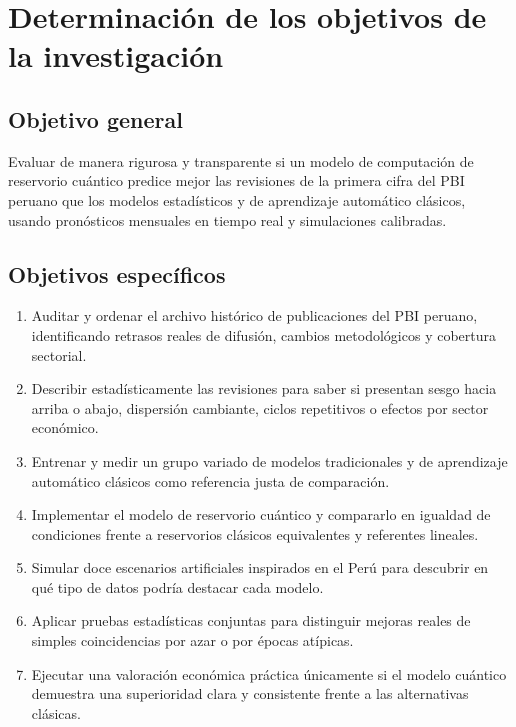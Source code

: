 \section{Determinación de los objetivos de la investigación}

\subsection{Objetivo general}

Evaluar de manera rigurosa y transparente si un modelo de computación de reservorio cuántico predice mejor las revisiones de la primera cifra del PBI peruano que los modelos estadísticos y de aprendizaje automático clásicos, usando pronósticos mensuales en tiempo real y simulaciones calibradas.

\subsection{Objetivos específicos}

\begin{enumerate}
	\item Auditar y ordenar el archivo histórico de publicaciones del PBI peruano, identificando retrasos reales de difusión, cambios metodológicos y cobertura sectorial.
	\item Describir estadísticamente las revisiones para saber si presentan sesgo hacia arriba o abajo, dispersión cambiante, ciclos repetitivos o efectos por sector económico.
	\item Entrenar y medir un grupo variado de modelos tradicionales y de aprendizaje automático clásicos como referencia justa de comparación.
	\item Implementar el modelo de reservorio cuántico y compararlo en igualdad de condiciones frente a reservorios clásicos equivalentes y referentes lineales.
	\item Simular doce escenarios artificiales inspirados en el Perú para descubrir en qué tipo de datos podría destacar cada modelo.
	\item Aplicar pruebas estadísticas conjuntas para distinguir mejoras reales de simples coincidencias por azar o por épocas atípicas.
	\item Ejecutar una valoración económica práctica únicamente si el modelo cuántico demuestra una superioridad clara y consistente frente a las alternativas clásicas.
\end{enumerate}
